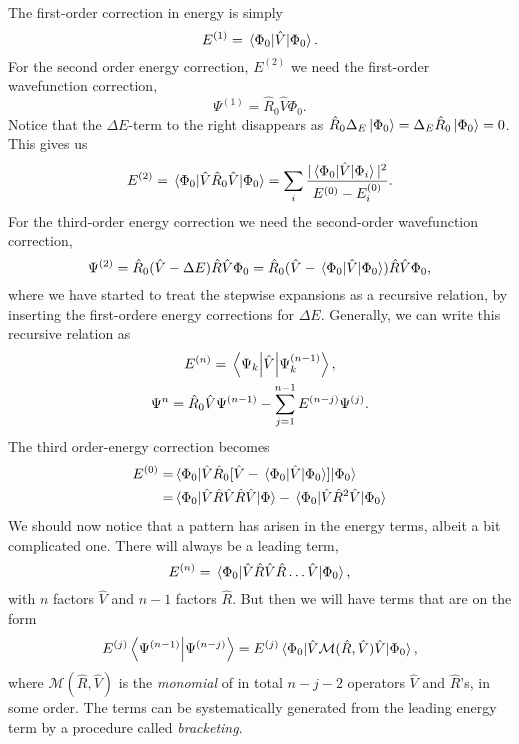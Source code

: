 The first-order correction in energy is simply
\begin{equation}
    E^{(1)} = \mel{\Phi_0}{\hat{V}}{\Phi_0}.
\end{equation}
For the second order energy correction, $E^{(2)}$ we need the first-order 
wavefunction correction,
\begin{equation}
    \Psi^{(1)} = \hat{R}_0\hat{V}\Phi_0.
\end{equation}
Notice that the $\Delta E$-term to the right disappears as 
$\hat{R}_0\Delta_E\ket{\Phi_0} = \Delta_E\hat{R}_0\ket{\Phi_0} = 0$.
This gives us
\begin{equation}
    E^{(2)} = \mel{\Phi_0}{\hat{V}\hat{R}_0\hat{V}}{\Phi_0}
        = \sum_{i} \frac{|\mel{\Phi_0}{\hat{V}}{\Phi_i}|^2}{E^{(0)} - E^{(0)}_i}.
\end{equation}
For the third-order energy correction we need the second-order wavefunction correction,
\begin{equation}
    \Psi^{(2)} = \hat{R}_0(\hat{V} - \Delta E)\hat{R}\hat{V} \Phi_0
        = \hat{R}_0(\hat{V} - \mel{\Phi_0}{\hat{V}}{\Phi_0})\hat{R}\hat{V} \Phi_0,
\end{equation}
where we have started to treat the stepwise expansions as a recursive relation, by 
inserting the first-ordere energy corrections for $\Delta E$. Generally, we can 
write this recursive relation as
\begin{gather}
    E^{(n)} = \mel{\Psi_k}{\hat{V}}{\Psi^{(n-1)}_k}, \\
    \Psi^{n} = \hat{R}_0 \hat{V}\Psi^{(n-1)} - \sum_{j=1}^{n-1}E^{(n-j)} \Psi^{(j)}.
\end{gather}
The third order-energy correction becomes
\begin{equation}
    \begin{aligned}
    E^{(0)} =& \mel{\Phi_0}{\hat{V}\hat{R}_0[\hat{V} - \mel{\Phi_0}{\hat{V}}{\Phi_0}]}{\Phi_0} \\
        =& \mel{\Phi_0}{\hat{V}\hat{R}\hat{V}\hat{R}\hat{V}}{\Phi}
            - \mel{\Phi_0}{\hat{V} \hat{R}^2\hat{V}}{\Phi_0}
    \end{aligned}
\end{equation}
We should now notice that a pattern has arisen in the energy terms, albeit a bit complicated one. 
There will always be a leading term,
\begin{equation}
    E^{(n)} = \mel{\Phi_0}{\hat{V}\hat{R}\hat{V}\hat{R}\dots\hat{V}}{\Phi_0},
\end{equation}
with $n$ factors $\hat{V}$ and $n-1$ factors $\hat{R}$. But then we will have 
terms that are on the form 
\begin{equation}
    E^{(j)}\braket{\Psi^{(n-1)}}{\Psi^{(n-j)}} 
    = E^{(j)}\mel{\Phi_0}{\hat{V}\mathcal{M}(\hat{R}, \hat{V})\hat{V}}{\Phi_0},
\end{equation}
where $\mathcal{M}(\hat{R}, \hat{V})$ is the \emph{monomial} of in total 
$n - j - 2$ operators $\hat{V}$ and $\hat{R}$'s, in some order. The terms 
can be systematically generated from the leading energy term by a procedure called 
\emph{bracketing}.

